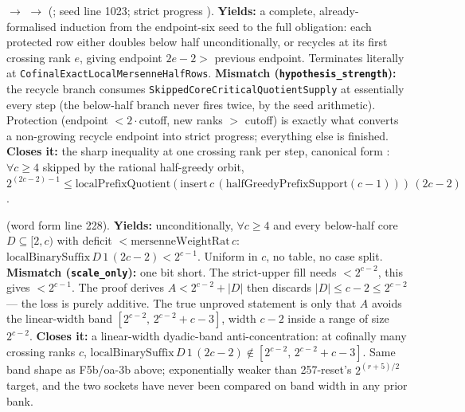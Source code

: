 \begin{obs} 
 $\to$
$\to$
(; seed
line 1023; strict progress ).
\textbf{Yields:} a complete, already-formalised induction from the endpoint-six seed to the full
obligation: each protected row either doubles below half unconditionally, or recycles at its
first crossing rank $e$, giving endpoint $2e{-}2 >$ previous endpoint. Terminates literally at
\texttt{CofinalExactLocalMersenneHalfRows}.
\textbf{Mismatch (\texttt{hypothesis\_strength}):} the recycle branch consumes
\texttt{SkippedCoreCriticalQuotientSupply} at essentially every step (the below-half branch never
fires twice, by the seed arithmetic). Protection (endpoint $< 2\cdot$cutoff, new ranks $>$
cutoff) is exactly what converts a non-growing recycle endpoint into strict progress; everything
else is finished.
\textbf{Closes it:} the sharp inequality at one crossing rank per step, canonical form
:
$\forall c \ge 4$ skipped by the rational half-greedy orbit, $2^{(2c-2)-1} \le
\mathrm{localPrefixQuotient}(\mathrm{insert}\,c\,(\mathrm{halfGreedyPrefixSupport}(c{-}1)))\,(2c{-}2)$.
\end{obs}

\begin{obs} 
(word form line 228).
\textbf{Yields:} unconditionally, $\forall c \ge 4$ and every below-half core $D \subseteq [2,c)$
with deficit $< \mathrm{mersenneWeightRat}\,c$: $\mathrm{localBinarySuffix}\,D\,1\,(2c{-}2) <
2^{c-1}$. Uniform in $c$, no table, no case split.
\textbf{Mismatch (\texttt{scale\_only}):} one bit short. The strict-upper fill needs
$<2^{c-2}$, this gives $<2^{c-1}$. The proof derives $A < 2^{c-2}+|D|$ then discards
$|D| \le c-2 \le 2^{c-2}$ — the loss is purely additive. The true unproved statement is only that
$A$ avoids the linear-width band $[2^{c-2},\,2^{c-2}+c-3]$, width $c{-}2$ inside a range of size
$2^{c-2}$.
\textbf{Closes it:} a linear-width dyadic-band anti-concentration: at cofinally many crossing
ranks $c$, $\mathrm{localBinarySuffix}\,D\,1\,(2c{-}2) \notin [2^{c-2},\,2^{c-2}+c-3]$. Same band
shape as F5b/oa-3b above; exponentially weaker than 257-reset's $2^{(r+5)/2}$ target, and the two
sockets have never been compared on band width in any prior bank.
\end{obs}

